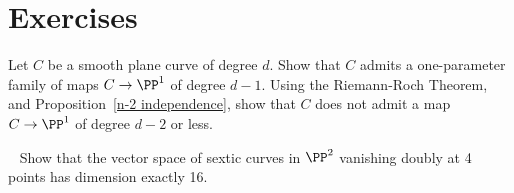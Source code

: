 \section{Exercises}
\begin{exercise}\label{gonality of smooth plane curve}
Let $C$ be a smooth plane curve of degree $d$. Show that $C$ admits a one-parameter family of maps $C \to \PP^1$ of degree $d-1$. Using the Riemann-Roch Theorem, and Proposition~\ref{n-2 independence}, show that $C$ does not admit a map $C \to \PP^1$ of degree $d-2$ or less. 
\end{exercise}

\begin{exercise}~\label{double vanishing at 4 points}
Show that the vector space of sextic curves in $\PP^2$ vanishing doubly at 4 points  has dimension
exactly 16.
\end{exercise}




